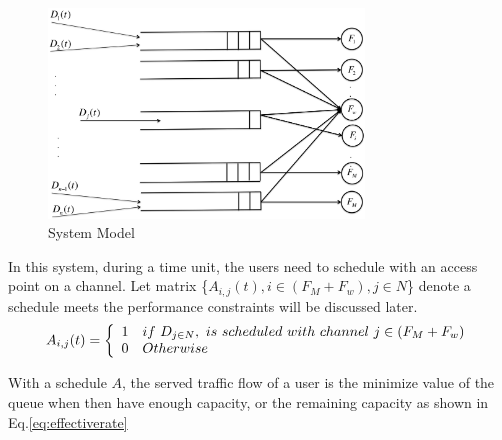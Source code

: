 




\begin{figure}
\vspace{-0.0in}
\centering
\includegraphics[width=84mm]{figures/flowconfig}
\vspace{-0.1in}
\caption{System Model}
\label{fig:flowconfig}
\vspace{-0.1in}
\end{figure}


In this system, during a time unit, the users need to schedule with an access point on a channel. 
Let matrix \{$A_{i,j}(t),i\in (F_M+F_w), j\in N$\} denote a schedule meets the performance constraints 
will be discussed later.
\begin{equation}
\label{eq:associate_def}
 A_{i,j}(t) = \left\{ 
	  \begin{array}{l l}
	    1   &  if\ D_{j\in N},\ is\ scheduled\ with\ channel\ j \in (F_M+F_w) \\
		0 &  Otherwise
			    \end{array} \right.
\end{equation}






With a schedule $A$, the served traffic flow of a user is the minimize value of the queue when then have 
enough capacity, or the remaining capacity as shown in Eq.\ref{eq:effectiverate}


